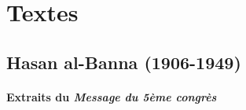 \section{Textes}




  
 

\hypertarget{hasan-al-banna-1906-1949}{%
\subsection{\texorpdfstring{{Hasan al-Banna
(1906-1949)}}{Hasan al-Banna (1906-1949)}}\label{hasan-al-banna-1906-1949}}

\paragraph{Extraits du \emph{Message du 5ème congrès} 
}

